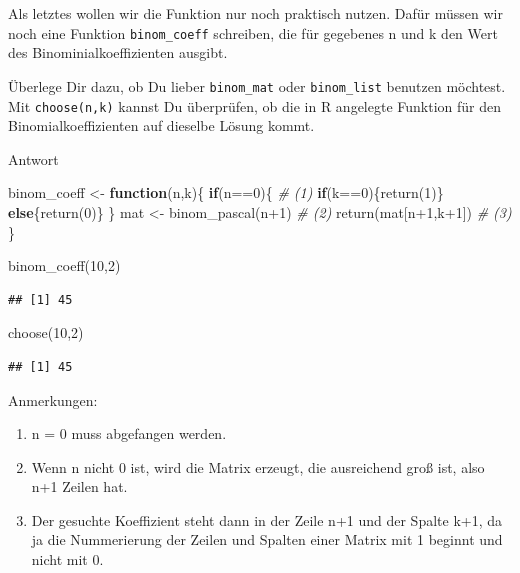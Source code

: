 \documentclass[
]{book}
\newenvironment{Shaded}{\begin{snugshade}}{\end{snugshade}}
\newcommand{\CommentTok}[1]{\textcolor[rgb]{0.56,0.35,0.01}{\textit{#1}}}
\newcommand{\ControlFlowTok}[1]{\textcolor[rgb]{0.13,0.29,0.53}{\textbf{#1}}}
\newcommand{\DecValTok}[1]{\textcolor[rgb]{0.00,0.00,0.81}{#1}}
\newcommand{\FunctionTok}[1]{\textcolor[rgb]{0.00,0.00,0.00}{#1}}
\newcommand{\NormalTok}[1]{#1}
\newcommand{\OtherTok}[1]{\textcolor[rgb]{0.56,0.35,0.01}{#1}}
\newcommand{\SpecialCharTok}[1]{\textcolor[rgb]{0.00,0.00,0.00}{#1}}
\begin{document}
Als letztes wollen wir die Funktion nur noch praktisch nutzen.
Dafür müssen wir noch eine Funktion \texttt{binom\_coeff} schreiben, die für gegebenes n und k den Wert des Binominialkoeffizienten ausgibt.

Überlege Dir dazu, ob Du lieber \texttt{binom\_mat} oder \texttt{binom\_list} benutzen möchtest.
Mit \texttt{choose(n,k)} kannst Du überprüfen, ob die in R angelegte Funktion für den Binomialkoeffizienten auf dieselbe Lösung kommt.

Antwort

\begin{Shaded}
\begin{Highlighting}[]
\NormalTok{binom\_coeff }\OtherTok{\textless{}{-}} \ControlFlowTok{function}\NormalTok{(n,k)\{}
  \ControlFlowTok{if}\NormalTok{(n}\SpecialCharTok{==}\DecValTok{0}\NormalTok{)\{                               }\CommentTok{\# (1)}
    \ControlFlowTok{if}\NormalTok{(k}\SpecialCharTok{==}\DecValTok{0}\NormalTok{)\{}\FunctionTok{return}\NormalTok{(}\DecValTok{1}\NormalTok{)\} }\ControlFlowTok{else}\NormalTok{\{}\FunctionTok{return}\NormalTok{(}\DecValTok{0}\NormalTok{)\}}
\NormalTok{  \}}
\NormalTok{  mat }\OtherTok{\textless{}{-}} \FunctionTok{binom\_pascal}\NormalTok{(n}\SpecialCharTok{+}\DecValTok{1}\NormalTok{)                }\CommentTok{\# (2)}
  \FunctionTok{return}\NormalTok{(mat[n}\SpecialCharTok{+}\DecValTok{1}\NormalTok{,k}\SpecialCharTok{+}\DecValTok{1}\NormalTok{])                    }\CommentTok{\# (3)}
\NormalTok{\}}

\FunctionTok{binom\_coeff}\NormalTok{(}\DecValTok{10}\NormalTok{,}\DecValTok{2}\NormalTok{)}
\end{Highlighting}
\end{Shaded}

\begin{verbatim}
## [1] 45
\end{verbatim}

\begin{Shaded}
\begin{Highlighting}[]
\FunctionTok{choose}\NormalTok{(}\DecValTok{10}\NormalTok{,}\DecValTok{2}\NormalTok{)}
\end{Highlighting}
\end{Shaded}

\begin{verbatim}
## [1] 45
\end{verbatim}

Anmerkungen:

\begin{enumerate}
\def\labelenumi{(\arabic{enumi})}
\item
  n = 0 muss abgefangen werden.
\item
  Wenn n nicht 0 ist, wird die Matrix erzeugt, die ausreichend groß ist, also n+1 Zeilen hat.
\item
  Der gesuchte Koeffizient steht dann in der Zeile n+1 und der Spalte k+1, da ja die Nummerierung der Zeilen und Spalten einer Matrix mit 1 beginnt und nicht mit 0.
\end{enumerate}
\end{document}
